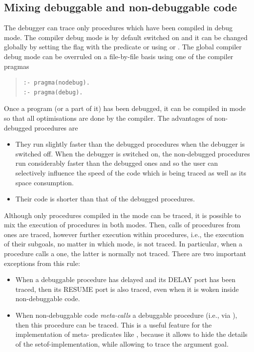 \subsection{Mixing debuggable and non-debuggable code}

The debugger can trace only procedures which have been compiled in
debug mode.  The compiler debug mode is by default switched on and it
can be changed globally by setting the flag  with the
predicate or using
 or
.
The global compiler debug mode can be overruled on a file-by-file basis
using one of the compiler pragmas
\begin{quote}
\begin{verbatim}
:- pragma(nodebug).
:- pragma(debug).
\end{verbatim}
\end{quote}
Once a program (or a part of it) has been
debugged, it can be compiled in  mode so that all
optimisations are done by the compiler.  The advantages of
non-debugged procedures are

\begin{itemize}
\item They run slightly faster than the debugged procedures
when the debugger is switched off.  When the debugger is switched on,
the non-debugged procedures run considerably faster than the debugged
ones and so the user can selectively influence the speed of the code
which is being traced as well as its space consumption.

\item Their code is shorter than that of the debugged procedures.
\end{itemize}

Although only procedures compiled in the  mode can be
traced, it is possible to mix the execution of procedures in both
modes.  Then, calls of  procedures from 
ones are
traced, however further execution within  procedures,
i.e., the execution of their subgoals, no matter in which mode, is not
traced.  In particular, when a  procedure calls a
one, the latter is normally not traced.
There are two important exceptions from this rule:
\begin{itemize}
\item When a debuggable procedure has delayed and its DELAY port has
been traced, then its RESUME port is also traced, even when it is woken
inside non-debuggable code.
\item When non-debuggable code \emph{meta-calls} a debuggable procedure
(i.e., via ),
then this procedure can be traced.  This is a useful feature for the
implementation of meta- predicates like
, because it
allows to hide the details of the setof-implementation, while allowing
to trace the argument goal.
\end{itemize}

